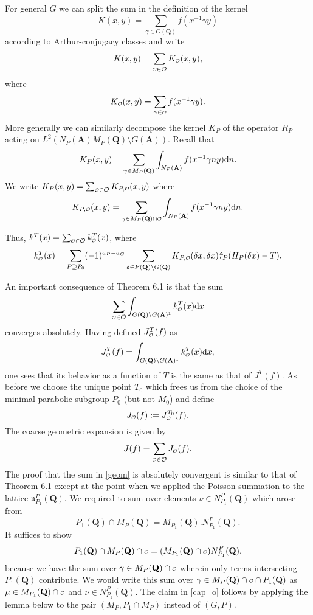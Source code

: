 \documentclass[11pt]{amsart}
\def\apg{a_{P} - a_{G}}
\def\A{\mathbf A}
\def\Q{\mathbf Q}
\def\O{\mathcal O}
\def\o{\scalebox{0.8}{$\scriptstyle\mathcal{O}$}}
\def\d{\text d}
\def\bs{\setminus} 			%
\def\Ltwo{L^2}
\def\nnn{\mathfrak n}
\theoremstyle{remark}
\begin{document}
For general $G$ we can split the sum in the definition of the kernel
\[ K(x, y) = \sum_{\gamma \in G(\Q)} f(x^{-1} \gamma y) \]
according to Arthur-conjugacy classes and write
\[ K(x, y) = \sum_{\o \in \O} K_{\o}(x, y),\]
where
\[ K_{\o}(x, y) = \sum_{\gamma \in \o} f(x^{-1}\gamma y). \]
More generally we can similarly decompose the kernel $K_P$ of the operator $R_P$ acting on $\Ltwo(N_P(\A) M_P(\Q) \bs G(\A))$. Recall that
\[ K_P(x, y) = \sum_{\gamma \in M_P(\Q)} \int_{N_P(\A)} f(x^{-1} \gamma n y) \d n. \]
We write $K_P(x, y) = \sum_{\o \in \O} K_{P, \o} (x, y)$ where
\[ K_{P, \o}(x, y) = \sum_{\gamma \in M_P(\Q) \cap \o} \int_{N_P(\A)} f(x^{-1} \gamma n y) \d n. \]

Thus, $k^T(x) = \sum_{\o \in \O} k^T_{\o}(x)$, where
\[ k^T_{\o}(x) = \sum_{P \supseteq P_0} (-1)^{\apg} \sum_{\delta\in P(\Q)\bs G(\Q)} K_{P, \o}(\delta x, \delta x) \hat\tau_P(H_P(\delta x) - T). \]

An important consequence of Theorem 6.1 is that the sum 
\begin{equation} \label{geom} 
	\sum_{\o \in \O} \int_{G(\Q) \bs G(\A)^1} k_{\o}^T(x) \d x 
\end{equation}
converges absolutely. Having defined $J_{\o}^T(f)$ as
\[ J_{\o}^T(f) = \int_{G(\Q) \bs G(\A)^1} k_{\o}^T(x) \d x, \]
one sees that its behavior as a function of $T$ is the same as that of $J^T(f)$. As before we choose the unique point $T_0$ which frees us from the choice of the minimal parabolic subgroup $P_0$ (but not $M_0$) and define 
\[ J_{\o}(f) := J^{T_0}_{\o}(f). \]
The coarse geometric expansion is given by
\begin{equation} \label{coarse_geom}
	J(f) = \sum_{\o \in \O} J_{\o}(f). 
\end{equation}
The proof that the sum in \cref{geom} is absolutely convergent is similar to that of Theorem 6.1 except at the point when we applied the Poisson summation to the lattice $\nnn_{P_1}^P(\Q)$. We required to sum over elements $\nu \in N_{P_1}^P(\Q)$ which arose from 
\[ P_1(\Q) \cap M_P(\Q) = M_{P_1}(\Q) . N_{P_1}^P(\Q). \]
It suffices to show 
\begin{equation} \label{cap_o}
	P_1(\Q) \cap M_P(\Q) \cap \o = (M_{P_1}(\Q) \cap \o) N_{P_1}^P(\Q),
\end{equation}
because we have the sum over $\gamma \in M_P(\Q) \cap \o$ wherein only terms intersecting $P_1(\Q)$ contribute. We would write this sum over $\gamma \in M_P(\Q) \cap \o \cap P_1(\Q)$ as $\mu \in M_{P_1}(\Q) \cap \o$ and $\nu \in N_{P_1}^P(\Q)$. The claim in \cref{cap_o} follows by applying the lemma below to the pair $(M_P, P_1 \cap M_P)$ instead of $(G, P)$. 
\end{document}
